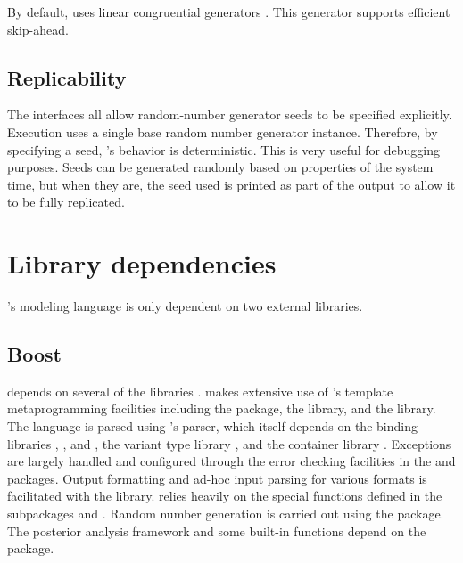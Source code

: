 \documentclass[article]{jss}
\begin{document}
By default,  uses linear congruential generators
\citep{LEcuyer:1988}.  This generator supports efficient skip-ahead.

\subsection{Replicability}

The  interfaces all allow random-number generator seeds
to be specified explicitly.  Execution uses a single base random
number generator instance.  Therefore, by specifying a seed,
's behavior is deterministic.  This is very useful for
debugging purposes.  Seeds can be generated randomly based on
properties of the system time, but when they are, the seed used is
printed as part of the output to allow it to be fully replicated.


\section{Library dependencies}

's modeling language is only dependent on two external
libraries.  

\subsection{Boost} 

 depends on several of the  
libraries \citep{Boost:2011}.   makes extensive use of
's template metaprogramming facilities including the
 package, the  library, and the
 library.  The  language is parsed
using 's  parser, which itself depends on
the binding libraries , , and ,
the variant type library , and the container library
.  Exceptions are largely handled and configured through
the error checking facilities in the  and
 packages.  Output formatting and ad-hoc input parsing
for various formats is facilitated with the  library.
 relies heavily on the special functions defined in the
 subpackages  and .  Random number generation is carried out using the
 package.  The posterior analysis framework and some
built-in functions depend on the  package.
\end{document}
